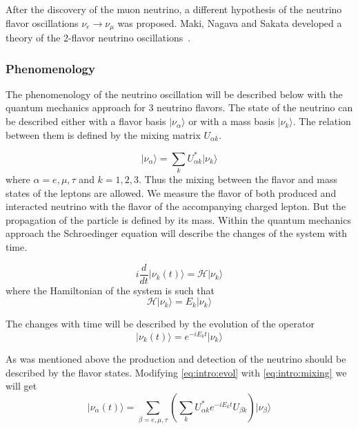 \documentclass[../main.tex]{subfiles}
\begin{document}
After the discovery of the muon neutrino, a different hypothesis of the neutrino flavor oscillations $\nu_e\to\nu_\mu$ was proposed. Maki, Nagava and Sakata developed a theory of the 2-flavor neutrino oscillations~\cite{Maki1962}.

\subsubsection{Phenomenology}
The phenomenology of the neutrino oscillation will be described below with the quantum mechanics approach for 3 neutrino flavors. The state of the neutrino can be described either with a flavor basis $\lvert\nu_\alpha\rangle$ or with a mass basis $\lvert\nu_k\rangle$. The relation between them is defined by the mixing matrix $U_{\alpha k}$.

\begin{equation}
\label{eq:intro:mixing}
\lvert\nu_\alpha\rangle = \sum_kU^*_{\alpha k}\lvert\nu_k\rangle
\end{equation}
where $\alpha = e, \mu, \tau$ and $k=1, 2, 3$. Thus the mixing between the flavor and mass states of the leptons are allowed. We measure the flavor of both produced and interacted neutrino with the flavor of the accompanying charged lepton. But the propagation of the particle is defined by its mass. Within the quantum mechanics approach the Schroedinger equation will describe the changes of the system with time.

\begin{equation}
i\frac{d}{dt}\lvert\nu_k(t)\rangle=\mathcal{H}\lvert\nu_k\rangle
\end{equation}
where the Hamiltonian of the system is such that
\begin{equation}
\label{eq:intro:ham}
\mathcal{H}\lvert\nu_k\rangle=E_k\lvert\nu_k\rangle
\end{equation}

The changes with time will be described by the evolution of the operator
\begin{equation}
\label{eq:intro:evol}
\lvert\nu_k(t)\rangle=e^{-iE_kt}\lvert\nu_k\rangle
\end{equation}

As was mentioned above the production and detection of the neutrino should be described by the flavor states. Modifying \autoref{eq:intro:evol} with \autoref{eq:intro:mixing} we will get
\begin{equation}
\lvert\nu_\alpha(t)\rangle=\sum_{\beta=e, \mu, \tau}\left(\sum_k U^*_{\alpha k}e^{-iE_kt}U_{\beta k} \right)\lvert\nu_\beta\rangle
\end{equation}
\end{document}

